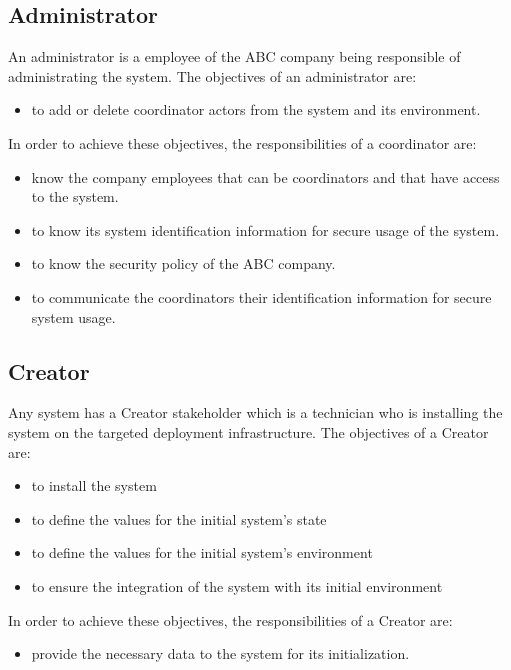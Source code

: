 \subsection{Administrator}
An administrator is a employee of the ABC company being responsible of
administrating the \msrprojectname system. The objectives of an administrator are:
\begin{itemize}
\item    to add or delete coordinator actors from the system and its
 environment.
\end{itemize}
In order to achieve these objectives, the responsibilities of a coordinator are:
\begin{itemize}
\item    know the company employees that can be coordinators and that have
 access to the system.
\item    to know its system identification information for secure usage of the
 system.
\item    to know the security policy of the ABC company.
\item    to communicate the coordinators their identification information for
 secure system usage.
\end{itemize}

\subsection{Creator}
Any system has a Creator stakeholder which is a technician who is installing the
\msrprojectname system on the targeted deployment infrastructure. The objectives of a
Creator are:
\begin{itemize}
	\item to install the \msrprojectname system
	\item to define the values for the initial system's state
	\item to define the values for the initial system's environment
	\item to ensure the integration of the \msrprojectname system with its initial
	environment
\end{itemize}
In order to achieve these objectives, the responsibilities of a Creator are:
\begin{itemize}
\item provide the necessary data to the \msrprojectname system for its initialization.
\end{itemize}
